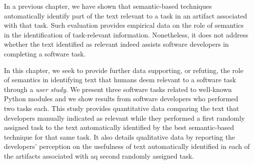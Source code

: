  
 

















In a previous chapter, we have shown that semantic-based techniques automatically identify part of the text relevant to a task in an artifact associated with that task.
Such evaluation provides empirical data on the role of semantics in the identification of task-relevant information.
Nonetheless, it does not address whether the text identified as relevant indeed assists software developers in completing a software task.



In this chapter, we seek to provide further data supporting, or refuting, the role of semantics 
in identifying text that humans deem relevant to a software task through a \textit{user study}. 
We present three software tasks related to well-known Python modules and we show 
results from  software developers who performed two tasks each. 
This study provides quantitative data comparing the text that developers manually indicated as relevant 
while they performed a first randomly assigned task to
the text automatically identified by the best semantic-based technique for 
that same task. It also details qualitative data by reporting the developers' perception on 
the usefulness of text automatically identified in each of the artifacts associated with aq second randomly assigned task. 


